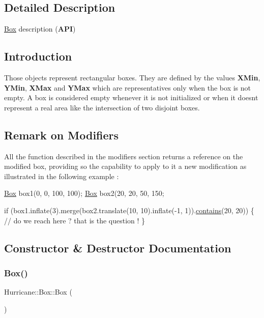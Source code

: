 \subsection{Detailed Description}
\mbox{\hyperlink{classHurricane_1_1Box}{Box}} description ({\bfseries A\+PI}) 

\hypertarget{classHurricane_1_1Box_secBoxIntro}{}\subsection{Introduction}\label{classHurricane_1_1Box_secBoxIntro}
Those objects represent rectangular boxes. They are defined by the values {\bfseries X\+Min}, {\bfseries Y\+Min}, {\bfseries X\+Max} and {\bfseries Y\+Max} which are representatives only when the box is not empty. A box is considered empty whenever it is not initialized or when it doesn\textquotesingle{}t represent a real area like the intersection of two disjoint boxes.\hypertarget{classHurricane_1_1Box_secBoxModifierRemark}{}\subsection{Remark on Modifiers}\label{classHurricane_1_1Box_secBoxModifierRemark}
All the function described in the modifiers section returns a reference on the modified box, providing so the capability to apply to it a new modification as illustrated in the following example \+: 
\begin{DoxyCode}
\mbox{\hyperlink{classHurricane_1_1Box_a445dd24bf83759bb47fc483fc7da024f}{Box}} box1(0, 0, 100, 100);
\mbox{\hyperlink{classHurricane_1_1Box_a445dd24bf83759bb47fc483fc7da024f}{Box}} box2(20, 20, 50, 150;
 
\textcolor{keywordflow}{if} (box1.inflate(3).merge(box2.translate(10, 10).inflate(-1, 1)).\mbox{\hyperlink{classHurricane_1_1Box_ae18dd30ffbf0b75714ece480f21e2898}{contains}}(20, 20)) \{
   \textcolor{comment}{// do we reach here ? that is the question !}
\}
\end{DoxyCode}
 

\subsection{Constructor \& Destructor Documentation}
\mbox{\label{classHurricane_1_1Box_a445dd24bf83759bb47fc483fc7da024f}} 
\subsubsection{\texorpdfstring{Box()}{Box()}\hspace{0.1cm}{\footnotesize\ttfamily [1/6]}}
{\footnotesize\ttfamily Hurricane\+::\+Box\+::\+Box (\begin{DoxyParamCaption}{ }\end{DoxyParamCaption})}

